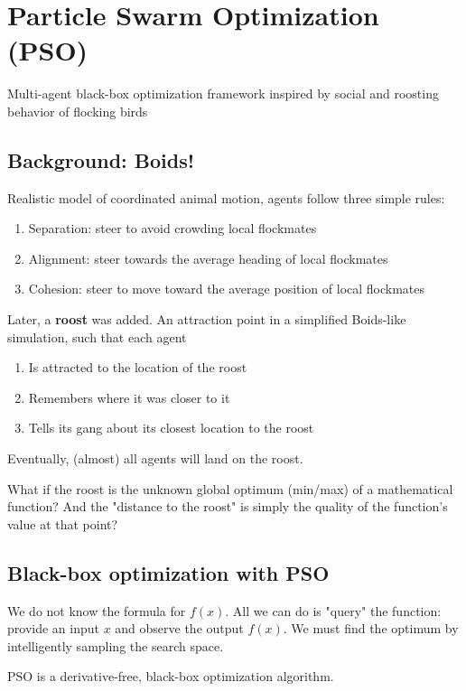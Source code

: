 \chapter*{Particle Swarm Optimization (PSO)}

Multi-agent black-box optimization framework inspired by
social and roosting behavior of flocking birds

\section*{Background: Boids!}

Realistic model of coordinated animal motion, agents follow three simple rules:
\begin{enumerate}
    \item Separation: steer to avoid crowding local flockmates
    \item Alignment: steer towards the average heading of local flockmates 
    \item Cohesion: steer to move toward the average position of local flockmates
\end{enumerate}

Later, a \textbf{roost} was added. An attraction point in a simplified
Boids-like simulation, such that each agent

\begin{enumerate}
    \item Is attracted to the location of the roost 
    \item Remembers where it was closer to it 
    \item Tells its gang about its closest location to the roost
\end{enumerate}

Eventually, (almost) all agents will land on the roost.

What if the roost is the unknown global optimum (min/max) of a mathematical 
function? And the "distance to the roost" is simply the quality of the function's value at that point?

\section*{Black-box optimization with PSO}

We do not know the formula for $f(x)$. All we can do is 
"query" the function: provide an input $x$ and observe the output $f(x)$. 
We must find the optimum by intelligently sampling the search space.

PSO is a derivative-free, black-box optimization algorithm.

